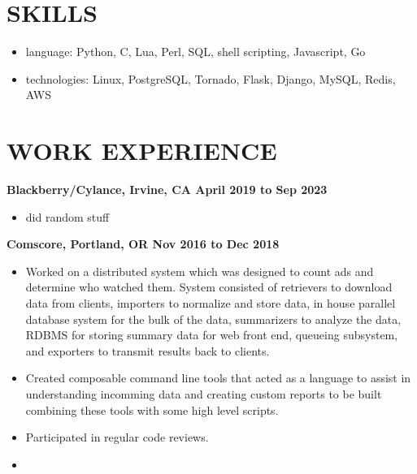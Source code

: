 \documentclass{res}
\begin{document}

\address{john@jjdev.com - (657) 400 9422 - Westminster, CA 92683}

\begin{resume}
  \section{SKILLS}

  \begin{itemize}

  \item
    language: Python, C, Lua, Perl, SQL, shell scripting, Javascript, Go
  \item
    technologies: Linux, PostgreSQL, Tornado, Flask, Django, MySQL, Redis, AWS
  \end{itemize}

  \section{WORK EXPERIENCE}

  {\large \bf Blackberry/Cylance, Irvine, CA \hfill April 2019 to Sep 2023}
  \begin{itemize}
  \item
  did random stuff
  \end{itemize}

  {\large \bf Comscore, Portland, OR \hfill Nov 2016 to Dec 2018}
  \begin{itemize}

  \item
    Worked on a distributed system which was designed to count ads and
    determine who watched them.  System consisted of retrievers to download
    data from clients, importers to normalize and store data, in house
    parallel database system for the bulk of the data, summarizers to
    analyze the data, RDBMS for storing summary data for
    web front end, queueing subsystem, and exporters to transmit
    results back to clients.

  \item
    Created composable command line tools that acted as a language to
    assist in understanding incomming data and creating custom reports to
    be built combining these tools with some high level scripts.

  \item
    Participated in regular code reviews.

  \item


\end{itemize}
\end{resume}
\end{document}
